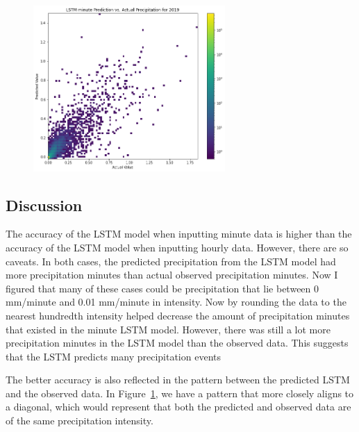 \documentclass[11pt]{report}
\begin{document}
\begin{figure}[bh!]
	\centering
	\includegraphics[width = 0.65\textwidth]{Figures/LSTM_minute_compare.png}
	\caption[LSTM minute prediction vs. actual data ]{\label{LSTM_minute_compare}
	}
\end{figure}
\clearpage
\subsection{Discussion}
The accuracy of the LSTM model when inputting minute data is higher than the accuracy of the LSTM model when inputting hourly data. However, there are so caveats. In both cases, the predicted precipitation from the LSTM model had more precipitation minutes than actual observed precipitation minutes. Now I figured that many of these cases could be precipitation that lie between 0 mm/minute and 0.01 mm/minute in intensity. Now by rounding the data to the nearest hundredth intensity helped decrease the amount of precipitation minutes that existed in the minute LSTM model. However, there was still a lot more precipitation minutes in the LSTM model than the observed data. This suggests that the LSTM predicts many precipitation events 

The better accuracy is also reflected in the pattern between the predicted LSTM and the observed data. In Figure~\ref{LSTM_minute_compare}, we have a pattern that more closely aligns to a diagonal, which would represent that both the predicted and observed data are of the same precipitation intensity. 


\clearpage
\end{document}

